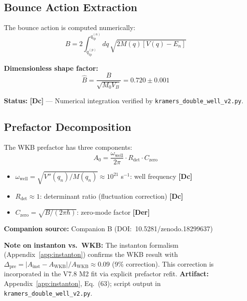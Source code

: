 \documentclass[11pt,a4paper]{article}
\newcommand{\tagDc}{\textcolor{blue!70!black}{\textbf{[Dc]}}}
\newcommand{\tagDer}{\textcolor{green!50!black}{\textbf{[Der]}}}
\begin{document}
\subsection{Bounce Action Extraction}

The bounce action is computed numerically:
\begin{equation}
    B = 2 \int_{q_{\text{tp}}^{(p)}}^{q_{\text{tp}}^{(n)}} dq \, \sqrt{2 M(q) \left[ V(q) - E_n \right]}
\end{equation}

\textbf{Dimensionless shape factor:}
\begin{equation}
    \hat{B} = \frac{B}{\sqrt{M_0 V_B}} = 0.720 \pm 0.001
\end{equation}

\textbf{Status:} \tagDc{} --- Numerical integration verified by \texttt{kramers\_double\_well\_v2.py}.

\subsection{Prefactor Decomposition}

The WKB prefactor has three components:
\begin{equation}
    A_0 = \frac{\omega_{\text{well}}}{2\pi} \cdot R_{\text{det}} \cdot C_{\text{zero}}
\end{equation}

\begin{itemize}[nosep]
    \item $\omega_{\text{well}} = \sqrt{V''(q_n)/M(q_n)} \approx 10^{21}$ s$^{-1}$: well frequency \tagDc{}
    \item $R_{\text{det}} \approx 1$: determinant ratio (fluctuation correction) \tagDc{}
    \item $C_{\text{zero}} = \sqrt{B/(2\pi\hbar)}$: zero-mode factor \tagDer{}
\end{itemize}

\textbf{Companion source:} Companion B (DOI:~10.5281/zenodo.18299637)

\textbf{Note on instanton vs.~WKB:} The instanton formalism (Appendix~\ref{app:instanton}) confirms the WKB result with $\Delta_{\text{pre}} = |A_{\text{inst}} - A_{\text{WKB}}|/A_{\text{WKB}} \approx 0.09$ (9\% correction). This correction is incorporated in the V7.8 M2 fit via explicit prefactor refit. \textbf{Artifact:} Appendix~\ref{app:instanton}, Eq.~(63); script output in \texttt{kramers\_double\_well\_v2.py}.

\end{document}
